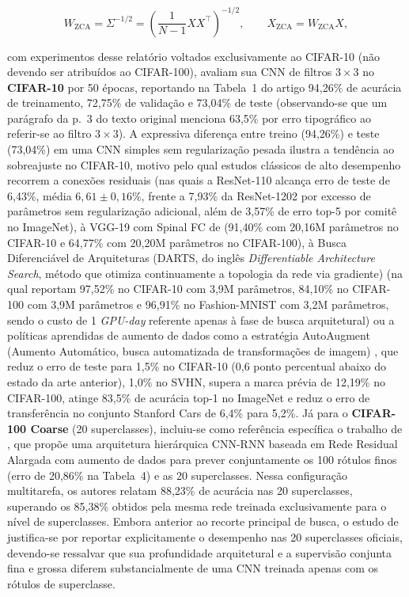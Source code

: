 \documentclass[
    12pt,
    openright,
    oneside,
    a4paper,
    english,
    brazil
]{abntex2}
\begin{document}
\begin{equation}
\label{eq:zca_whitening}
W_{\text{ZCA}} = \Sigma^{-1/2} = \left(\frac{1}{N-1} X X^\top\right)^{-1/2},
\qquad
X_{\text{ZCA}} = W_{\text{ZCA}} X,
\end{equation}

com experimentos desse relatório voltados exclusivamente ao CIFAR-10 (não devendo ser atribuídos ao CIFAR-100),  avaliam sua CNN de filtros \(3 \times 3\) no \textbf{CIFAR-10} por 50 épocas, reportando na Tabela~1 do artigo 94,26\% de acurácia de treinamento, 72,75\% de validação e 73,04\% de teste (observando-se que um parágrafo da p.~3 do texto original menciona 63,5\% por erro tipográfico ao referir-se ao filtro \(3 \times 3\)). A expressiva diferença entre treino (94,26\%) e teste (73,04\%) em uma CNN simples sem regularização pesada ilustra a tendência ao sobreajuste no CIFAR-10, motivo pelo qual estudos clássicos de alto desempenho recorrem a conexões residuais \cite{he2016resnet} (nas quais a ResNet-110 alcança erro de teste de 6,43\%, média \(6{,}61 \pm 0{,}16\%\), frente a 7,93\% da ResNet-1202 por excesso de parâmetros sem regularização adicional, além de 3,57\% de erro top-5 por comitê no ImageNet), à VGG-19 com Spinal FC de  (91,40\% com 20,16M parâmetros no CIFAR-10 e 64,77\% com 20,20M parâmetros no CIFAR-100), à Busca Diferenciável de Arquiteturas (DARTS, do inglês \textit{Differentiable Architecture Search}, método que otimiza continuamente a topologia da rede via gradiente) \cite{liu2019darts,tanveer2021darts} (na qual  reportam 97,52\% no CIFAR-10 com 3,9M parâmetros, 84,10\% no CIFAR-100 com 3,9M parâmetros e 96,91\% no Fashion-MNIST com 3,2M parâmetros, sendo o custo de 1 \textit{GPU-day} referente apenas à fase de busca arquitetural) ou a políticas aprendidas de aumento de dados como a estratégia AutoAugment (Aumento Automático, busca automatizada de transformações de imagem) \cite{cubuk2019autoaugment}, que reduz o erro de teste para 1,5\% no CIFAR-10 (0,6 ponto percentual abaixo do estado da arte anterior), 1,0\% no SVHN, supera a marca prévia de 12,19\% no CIFAR-100, atinge 83,5\% de acurácia top-1 no ImageNet e reduz o erro de transferência no conjunto Stanford Cars de 6,4\% para 5,2\%. Já para o \textbf{CIFAR-100 Coarse} (20 superclasses), incluiu-se como referência específica o trabalho de , que propõe uma arquitetura hierárquica CNN-RNN baseada em Rede Residual Alargada \cite{zagoruyko2016wrn} com aumento de dados para prever conjuntamente os 100 rótulos finos (erro de 20,86\% na Tabela~4) e as 20 superclasses. Nessa configuração multitarefa, os autores relatam 88,23\% de acurácia nas 20 superclasses, superando os 85,38\% obtidos pela mesma rede treinada exclusivamente para o nível de superclasses. Embora anterior ao recorte principal de busca, o estudo de  justifica-se por reportar explicitamente o desempenho nas 20 superclasses oficiais, devendo-se ressalvar que sua profundidade arquitetural e a supervisão conjunta fina e grossa diferem substancialmente de uma CNN treinada apenas com os rótulos de superclasse.
\end{document}
